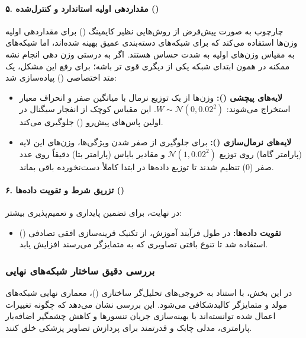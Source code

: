 \documentclass{article}
\begin{document}
\paragraph{۵. مقداردهی اولیه استاندارد و کنترل‌شده ()}
چارچوب  به صورت پیش‌فرض از روش‌هایی نظیر کایمینگ () برای مقداردهی اولیه وزن‌ها استفاده می‌کند که برای شبکه‌های دسته‌بندی عمیق بهینه شده‌اند، اما شبکه‌های  به مقیاس وزن‌های اولیه به شدت حساس هستند. اگر به درستی وزن دهی انجام نشه ممکنه در همون ابتدای شبکه یکی از دیگری قوی تر باشه؛ برای رفع این مشکل، یک متد اختصاصی () پیاده‌سازی شد:
\begin{itemize}
	\item \textbf{لایه‌های پیچشی ():} وزن‌ها از یک توزیع نرمال با میانگین صفر و انحراف معیار  استخراج می‌شوند: $W \sim \mathcal{N}(0, 0.02^2)$. این مقیاس کوچک از انفجار سیگنال در اولین پاس‌های پیش‌رو () جلوگیری می‌کند.
	\item \textbf{لایه‌های نرمال‌سازی ():} برای جلوگیری از صفر شدن ویژگی‌ها، وزن‌های این لایه (پارامتر گاما) روی توزیع $\mathcal{N}(1, 0.02^2)$ و مقادیر بایاس (پارامتر بتا) دقیقاً روی عدد صفر ($0$) تنظیم شدند تا توزیع داده‌ها در ابتدا کاملاً دست‌نخورده باقی بماند.
\end{itemize}


\paragraph{۶. تزریق شرط و تقویت داده‌ها ()}
در نهایت، برای تضمین پایداری و تعمیم‌پذیری بیشتر:
\begin{itemize}
	\item \textbf{تقویت داده‌ها:} در طول فرآیند آموزش، از تکنیک قرینه‌سازی افقی تصادفی () استفاده شد تا تنوع بافتی تصاویری که به متمایزگر می‌رسند افزایش یابد.
	
\end{itemize}

\subsubsection{بررسی دقیق ساختار شبکه‌های نهایی}

در این بخش، با استناد به خروجی‌های تحلیل‌گر ساختاری ()، معماری نهایی شبکه‌های مولد و متمایزگر کالبدشکافی می‌شود. این بررسی نشان می‌دهد که چگونه تغییرات اعمال شده توانسته‌اند با بهینه‌سازی جریان تنسورها و کاهش چشمگیر اضافه‌بار پارامتری، مدلی چابک و قدرتمند برای پردازش تصاویر پزشکی خلق کنند.
\end{document}

